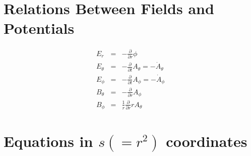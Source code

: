 \documentclass[11pt]{article}
\def\ddt{\frac{\partial}{\partial t}}
\def\ddr{\frac{\partial}{\partial r}}
\def\Er{E_r}
\def\Eth{E_\theta}
\def\Eph{E_\phi}
\def\Bth{B_\theta}
\def\Bph{B_\phi}
\def\Athd{\dot{A}_\theta}
\def\Aphd{\dot{A}_\phi}
\def\Ath{A_\theta}
\def\Aph{A_\phi}
\begin{document}
\bigskip

\section{Relations Between Fields and Potentials}
\setcounter{equation}{0}

\begin{eqnarray}
  \Er &=&
%
  - \ddr \phi
\\[5mm]
  \Eth &=&
%
  - \ddt \Ath = - \Athd
\\[5mm]
  \Eph &=&
%
  - \ddt \Aph = - \Aphd
\\[5mm]
  \Bth &=&
%
  - \ddr \Aph
\\[5mm]
  \Bph &=&
%
  \frac{1}{r} \ddr r \Ath
\end{eqnarray}

\bigskip

\section{Equations in $s(=r^2)$ coordinates}
\setcounter{equation}{0}
\end{document}
